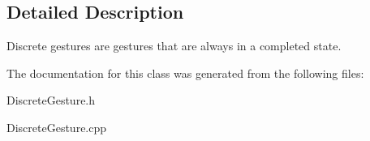 \subsection{Detailed Description}
Discrete gestures are gestures that are always in a completed state. 

The documentation for this class was generated from the following files\+:\begin{DoxyCompactItemize}
\item 
Discrete\+Gesture.\+h\item 
Discrete\+Gesture.\+cpp\end{DoxyCompactItemize}
